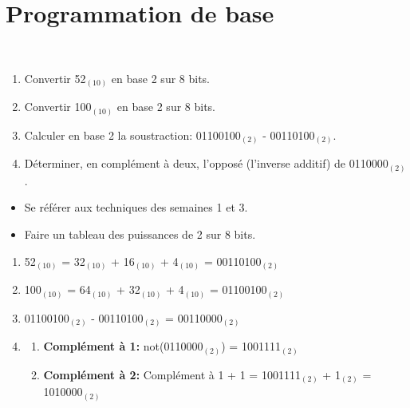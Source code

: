 \section{Programmation de base}

\begin{Exercice}[10 minutes]\\
    \begin{enumerate}
        \item Convertir 52$_{(10)}$ en base 2 sur 8 bits.
        \item Convertir 100$_{(10)}$ en base 2 sur 8 bits.
        \item Calculer en base 2 la soustraction: 01100100$_{(2)}$ - 00110100$_{(2)}$.
        \item Déterminer, en complément à deux, l'opposé (l'inverse additif) de 0110000$_{(2)}$.
    \end{enumerate}
\begin{conseil}
   \begin{itemize}
        \item Se référer aux techniques des semaines 1 et 3.
       \item Faire un tableau des puissances de 2 sur 8 bits.
   \end{itemize}
\end{conseil}
    
\begin{solution}
\begin{enumerate}
    \item 52$_{(10)}$ = 32$_{(10)}$ + 16$_{(10)}$ + 4$_{(10)}$ = 00110100$_{(2)}$
    \item 100$_{(10)}$ = 64$_{(10)}$ + 32$_{(10)}$ + 4$_{(10)}$ = 01100100$_{(2)}$
    \item 01100100$_{(2)}$ - 00110100$_{(2)}$ = 00110000$_{(2)}$
    \item 
        \begin{enumerate} 
            \item \textbf{Complément à 1:} not(0110000$_{(2)}$) = 1001111$_{(2)}$ 
            \item \textbf{Complément à 2:} Complément à 1 + 1 = 1001111$_{(2)}$ + 1$_{(2)}$ = 1010000$_{(2)}$
        \end{enumerate}
\end{enumerate}   
\end{solution}

\end{Exercice}

